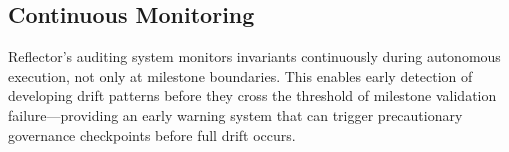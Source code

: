 \subsection{Continuous Monitoring}

Reflector's auditing system monitors invariants continuously during autonomous
execution, not only at milestone boundaries. This enables early detection of
developing drift patterns before they cross the threshold of milestone validation
failure—providing an early warning system that can trigger precautionary governance
checkpoints before full drift occurs.
